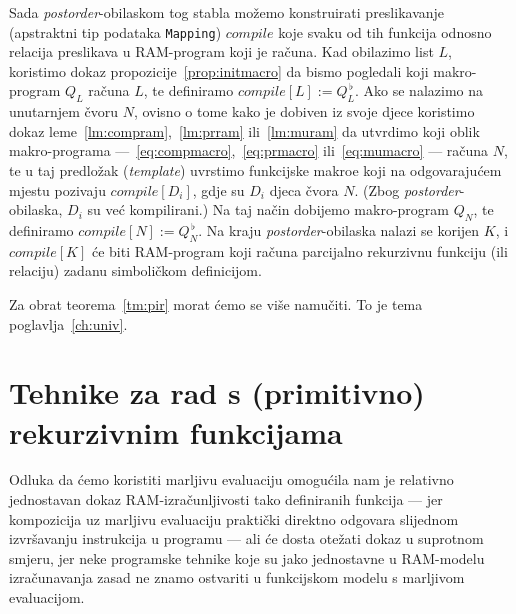 Sada \emph{postorder}-obilaskom tog stabla možemo konstruirati preslikavanje (apstraktni tip podataka \texttt{Mapping}) $compile$ koje svaku od tih funkcija odnosno relacija preslikava u RAM-program koji je računa. Kad obilazimo list $L$, koristimo dokaz propozicije~\ref{prop:initmacro} da bismo pogledali koji makro-program $Q_L$ računa $L$, te definiramo $compile[L]:=Q_L^{\,\flat}$. Ako se nalazimo na unutarnjem čvoru $N$, ovisno o tome kako je dobiven iz svoje djece koristimo dokaz leme~\ref{lm:compram},~\ref{lm:prram} ili~\ref{lm:muram} da utvrdimo koji oblik makro-programa ---~\eqref{eq:compmacro},~\eqref{eq:prmacro} ili~\eqref{eq:mumacro} --- računa $N$, te u taj predložak (\emph{template}) uvrstimo funkcijske makroe koji na odgovarajućem mjestu pozivaju $compile[D_i]$, gdje su $D_i$ djeca čvora $N$. (Zbog \emph{postorder}-obilaska, $D_i$ su već kompilirani.) Na taj način dobijemo makro-program $Q_N$, te definiramo $compile[N]:=Q_N^{\,\flat}$. Na kraju \emph{postorder}-obilaska nalazi se korijen $K$, i $compile[K]$ će biti RAM-program koji računa parcijalno rekurzivnu funkciju (ili relaciju) zadanu simboličkom definicijom.

Za obrat teorema~\ref{tm:pir} morat ćemo se više namučiti. To je tema poglavlja~\ref{ch:univ}.

\section{Tehnike za rad s (primitivno) rekurzivnim funkcijama}\label{sec:tech}

Odluka da ćemo koristiti marljivu evaluaciju omogućila nam je relativno jednostavan dokaz RAM-izračunljivosti tako definiranih funkcija --- jer kompozicija uz marljivu evaluaciju praktički direktno odgovara slijednom izvršavanju instrukcija u programu --- ali će dosta otežati dokaz u suprotnom smjeru, jer neke programske tehnike koje su jako jednostavne u RAM-modelu izračunavanja zasad ne znamo ostvariti u funkcijskom modelu s marljivom evaluacijom.

